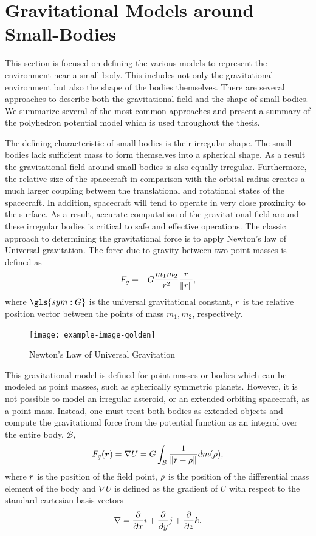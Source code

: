 \section{Gravitational Models around Small-Bodies}\label{sec:gravitational_models}
This section is focused on defining the various models to represent the environment near a small-body.
This includes not only the gravitational environment but also the shape of the bodies themselves.
There are several approaches to describe both the gravitational field and the shape of small bodies.
We summarize several of the most common approaches and present a summary of the polyhedron potential model which is used throughout the thesis.

The defining characteristic of small-bodies is their irregular shape.
The small bodies lack sufficient mass to form themselves into a spherical shape.
As a result the gravitational field around small-bodies is also equally irregular.
Furthermore, the relative size of the spacecraft in comparison with the orbital radius creates a much larger coupling between the translational and rotational states of the spacecraft.
In addition, spacecraft will tend to operate in very close proximity to the surface.
As a result, accurate computation of the gravitational field around these irregular bodies is critical to safe and effective operations.
The classic approach to determining the gravitational force is to apply Newton's law of Universal gravitation.
The force due to gravity between two point masses is defined as
\begin{align}\label{eq:newton_universal_gravitation}
    F_g =  - G \frac{m_1 m_2}{r^2} \frac{r}{\left\| r \right\|},
\end{align}
where \( \gls{sym:G} \) is the universal gravitational constant, \( r \) is the relative position vector between the points of mass \( m_1, m_2\), respectively.

\begin{figure}
    \centering
    \texttt{[image: example-image-golden]}
    \caption{Newton's Law of Universal Gravitation~\label{fig:universal_gravity}}
\end{figure}
This gravitational model is defined for point masses or bodies which can be modeled as point masses, such as spherically symmetric planets.
However, it is not possible to model an irregular asteroid, or an extended orbiting spacecraft, as a point mass.
Instead, one must treat both bodies as extended objects and compute the gravitational force from the potential function as an integral over the entire body, \( \mathcal{B}\),
\begin{align}\label{eq:volume_integral_potential}
    F_g ( \bm{r}) = \nabla U = G \int_{\mathcal{B}} \frac{1}{\left\| r - \rho  \right\|} dm (\rho),
\end{align}
where \( r \) is the position of the field point, \( \rho \) is the position of the differential mass element of the body and \( \nabla U \) is defined as the gradient of \( U \) with respect to the standard cartesian basis vectors
\begin{align*}
    \nabla = \frac{\partial }{\partial x} i + \frac{\partial }{\partial y} j + \frac{\partial }{\partial z} k.
\end{align*}

